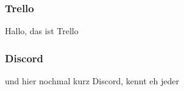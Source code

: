 \Author{\daAuthorTwo}

\subsubsection{Trello}
Hallo, das ist Trello

\subsubsection{Discord}
und hier nochmal kurz Discord, kennt eh jeder